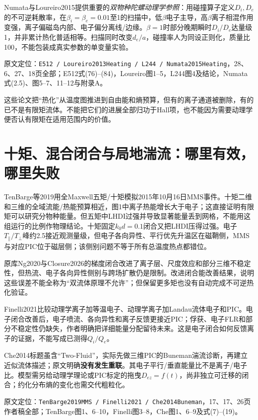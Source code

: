 \documentclass[UTF8,a4paper,11pt,openany,fontset=fandol]{ctexbook}
\newcommand{\loc}[2]{\par\noindent\textsf{原文定位：}\texttt{#1}，#2。\par}
\begin{document}
Numata与Loureiro2015提供重要的\emph{双物种陀螺动理学参照}：用碰撞算子定义$D_i,D_e$的不可逆耗散率，在$\beta_i=\beta_e=0.01$至1的扫描中，低$\beta$电子主导，高$\beta$离子相混作用变强，离子偏磁岛内部、电子偏分离线/边缘。$\beta=1$时部分晚期瞬时$D_i/D_e$达量级1，并非累计热化普适相等。扫描同时改变$d_e/a$，碰撞率人为同设正则化，质量比100，不能包装成真实参数的单变量实验。\citep{Numata2015Heating}
\loc{E512 / Loureiro2013Heating / L244 / Numata2015Heating}{28、6、27、18页全部；E512式(76)--(84)，Loureiro图1--5，L244图4及结论，Numata式(2.5)、图5--7、11--12与附录A}

这些论文把“热化”从温度图推进到自由能和熵预算，但有的离子通道被删除，有的已不是有限矩流体。不能把它们的进展全部归功于Hall项，也不能因为需要动理学便否认有限矩在适用范围内的价值。

\section{十矩、混合闭合与局地湍流：哪里有效，哪里失败}
TenBarge等2019用全Maxwell五矩/十矩模拟2015年10月16日MMS事件。十矩二维和三维的全域流能/热能预算相近，图1中离子热能增长大于电子；这直接证明有限矩可以研究分物种能量。但五矩中LHDI过强并导致显著能量丢到网格，不能用这组运行的比例作物理结论。十矩固定$k_0d=0.1$闭合又把LHDI压得过强。电子$T_\parallel/T_\perp$峰约2.5接近观测量级，但电子各向异性、平行优先升温区在磁鞘侧，MMS与对应PIC位于磁层侧；该侧别问题不等于所有总温度热点都错位。\citep{TenBarge2019MMS}

原库Ng2020与Closure2026的梯度闭合改进了离子层、尺度效应和部分三维不稳定性，但热流、电子各向异性侧别与跨场扩散仍是限制。改进闭合能改善结果，说明这些误差不能全称为“双流体原理不允许”；但保留更多矩也没有自动完成不可逆热化验证。\citep{Ng2020,Closure2026}

Finelli2021比较动理学离子加等温电子、动理学离子加Landau流体电子和PIC。电子闭合改善后，电子喷流、各向异性和离子反馈更接近PIC；俘获、电子FLR和部分不稳定性仍缺失，作者明确把详细能量分配留待未来。这是电子闭合如何反馈离子的证据，不能写成已测得$Q_i/Q_e$。\citep{Finelli2021}

Che2014标题虽含“Two-Fluid”，实际先做三维PIC的Buneman湍流诊断，再建立近似流体描述；原文明确\textbf{没有发生重联}。其电子平行/垂直能量比不是离子/电子比。模型需另给动理学理论或PIC标定的拖曳$D_{ez}=f(t)$，尚非独立可迁移的闭合；约化分布熵的变化也需交代粗粒化。\citep{Che2014Buneman}
\loc{TenBarge2019MMS / Finelli2021 / Che2014Buneman}{17、17、26页作者稿全部；TenBarge图1、6--10，Finelli图3--8，Che图1、6--9及式(7)--(19)}


\end{document}
